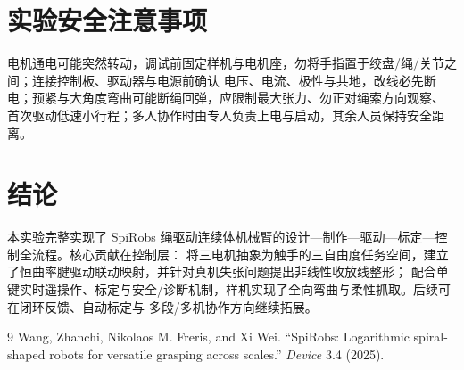 \documentclass[12pt,a4paper]{ctexart}
\begin{document}
\section{实验安全注意事项}
电机通电可能突然转动，调试前固定样机与电机座，勿将手指置于绞盘/绳/关节之间；连接控制板、驱动器与电源前确认
电压、电流、极性与共地，改线必先断电；预紧与大角度弯曲可能断绳回弹，应限制最大张力、勿正对绳索方向观察、
首次驱动低速小行程；多人协作时由专人负责上电与启动，其余人员保持安全距离。

\section{结论}
本实验完整实现了 SpiRobs 绳驱动连续体机械臂的设计—制作—驱动—标定—控制全流程。核心贡献在控制层：
将三电机抽象为触手的三自由度任务空间，建立了恒曲率腱驱动联动映射，并针对真机失张问题提出非线性收放线整形；
配合单键实时遥操作、标定与安全/诊断机制，样机实现了全向弯曲与柔性抓取。后续可在闭环反馈、自动标定与
多段/多机协作方向继续拓展。

\begin{thebibliography}{9}
 Wang, Zhanchi, Nikolaos M. Freris, and Xi Wei.
``SpiRobs: Logarithmic spiral-shaped robots for versatile grasping across scales.'' \emph{Device} 3.4 (2025).
\end{thebibliography}
\end{document}
